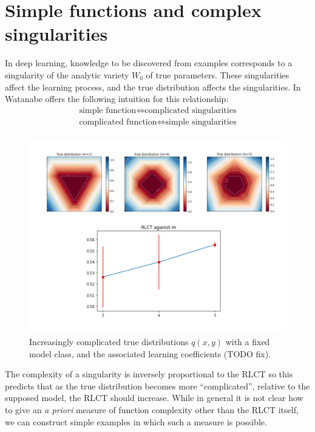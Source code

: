\documentclass{article} %
\begin{document}
\section{Simple functions and complex singularities}\label{section:simple_func}

In deep learning, knowledge to be discovered from examples corresponds to a singularity of the analytic variety $W_0$ of true parameters. These singularities affect the learning process, and the true distribution affects the singularities. In \citep[\S 7.6]{watanabe_algebraic_2009} Watanabe offers the following intuition for this relationship:
\begin{align*}
\text{simple function} \iff \text{complicated singularities}\\
\text{complicated function} \iff \text{simple singularities}\\
\end{align*}

\begin{figure}[h]
\begin{center}
\includegraphics[scale=0.3]{RLCT_m.pdf}
\end{center}
\caption{Increasingly complicated true distributions $q(x,y)$ with a fixed model class, and the associated learning coefficients (TODO fix).}
\label{figure:simp_func_complex}
\end{figure}

The complexity of a singularity is inversely proportional to the RLCT so this predicts that as the true distribution becomes more ``complicated'', relative to the supposed model, the RLCT should increase. While in general it is not clear how to give an \emph{a priori} measure of function complexity other than the RLCT itself, we can construct simple examples in which such a measure is possible.
\end{document}
